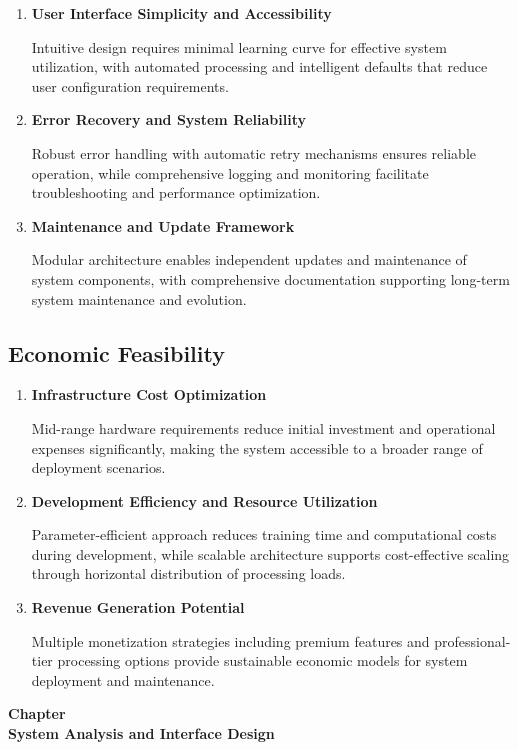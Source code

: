 \documentclass[12pt,a4paper]{report}
\begin{document}
\begin{enumerate}[label=\Roman*.]
\item \textbf{User Interface Simplicity and Accessibility}

Intuitive design requires minimal learning curve for effective system utilization, with automated processing and intelligent defaults that reduce user configuration requirements.

\item \textbf{Error Recovery and System Reliability}

Robust error handling with automatic retry mechanisms ensures reliable operation, while comprehensive logging and monitoring facilitate troubleshooting and performance optimization.

\item \textbf{Maintenance and Update Framework}

Modular architecture enables independent updates and maintenance of system components, with comprehensive documentation supporting long-term system maintenance and evolution.
\end{enumerate}

\subsection{Economic Feasibility}

\begin{enumerate}[label=\Roman*.]
\item \textbf{Infrastructure Cost Optimization}

Mid-range hardware requirements reduce initial investment and operational expenses significantly, making the system accessible to a broader range of deployment scenarios.

\item \textbf{Development Efficiency and Resource Utilization}

Parameter-efficient approach reduces training time and computational costs during development, while scalable architecture supports cost-effective scaling through horizontal distribution of processing loads.

\item \textbf{Revenue Generation Potential}

Multiple monetization strategies including premium features and professional-tier processing options provide sustainable economic models for system deployment and maintenance.
\end{enumerate}
\newpage
\clearpage
\thispagestyle{empty}  %
\vspace*{\fill}
\begin{center}
{\Huge\bfseries Chapter \thechapter}\\[30pt]
{\Huge\bfseries System Analysis and Interface Design}
\end{center}
\vspace*{\fill}
\label{ch:analysis}
\clearpage
\newpage
\end{document}
